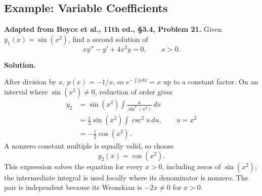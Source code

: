 \documentclass[11pt]{article}
\newenvironment{solution}
    {\par\noindent\textbf{Solution.}\par}
    {\par}
\begin{document}
\subsection{Example: Variable Coefficients}
\textbf{Adapted from Boyce et al., 11th ed., \S3.4, Problem 21.}
Given \(y_1(x)=\sin(x^2)\), find a second solution of
\[
xy''-y'+4x^3y=0,\qquad x>0.
\]
\begin{solution}
After division by \(x\), \(p(x)=-1/x\), so
\(e^{-\int p\,dx}=x\) up to a constant factor. On an interval
where \(\sin(x^2)\ne0\), reduction of order gives
\[
\begin{aligned}
y_2
&=\sin(x^2)\int\frac{x}{\sin^2(x^2)}\,dx\\
&=\frac12\sin(x^2)\int\csc^2u\,du,
\qquad u=x^2\\
&=-\frac12\cos(x^2).
\end{aligned}
\]
A nonzero constant multiple is equally valid, so choose
\[
\boxed{y_2(x)=\cos(x^2).}
\]
This expression solves the equation for every \(x>0\), including
zeros of \(\sin(x^2)\); the intermediate integral is used locally
where its denominator is nonzero. The pair is independent because
its Wronskian is \(-2x\ne0\) for \(x>0\).
\end{solution}
\end{document}
